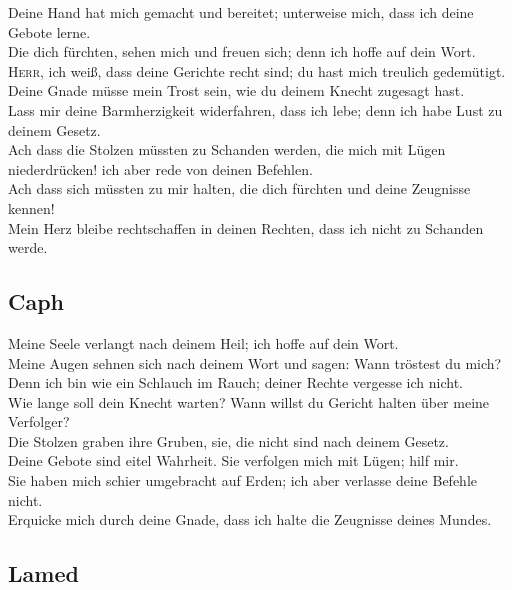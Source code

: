  Deine Hand hat mich gemacht und bereitet; unterweise
mich, dass ich deine Gebote lerne.\\
 Die dich fürchten, sehen mich und freuen sich; denn ich
hoffe auf dein Wort.\\
 \textsc{Herr}, ich weiß, dass deine Gerichte recht sind;
du hast mich treulich gedemütigt.\\
 Deine Gnade müsse mein Trost sein, wie du deinem Knecht
zugesagt hast.\\
 Lass mir deine Barmherzigkeit widerfahren, dass ich
lebe; denn ich habe Lust zu deinem Gesetz.\\
 Ach dass die Stolzen müssten zu Schanden werden, die
mich mit Lügen niederdrücken! ich aber rede von deinen Befehlen.\\
 Ach dass sich müssten zu mir halten, die dich fürchten
und deine Zeugnisse kennen!\\
 Mein Herz bleibe rechtschaffen in deinen Rechten, dass
ich nicht zu Schanden werde.

\hypertarget{caph}{%
\subsection{Caph}\label{caph}}

 Meine Seele verlangt nach deinem Heil; ich hoffe auf
dein Wort.\\
 Meine Augen sehnen sich nach deinem Wort und sagen: Wann
tröstest du mich?\\
 Denn ich bin wie ein Schlauch im Rauch; deiner Rechte
vergesse ich nicht.\\
 Wie lange soll dein Knecht warten? Wann willst du
Gericht halten über meine Verfolger?\\
 Die Stolzen graben ihre Gruben, sie, die nicht sind nach
deinem Gesetz.\\
 Deine Gebote sind eitel Wahrheit. Sie verfolgen mich mit
Lügen; hilf mir.\\
 Sie haben mich schier umgebracht auf Erden; ich aber
verlasse deine Befehle nicht.\\
 Erquicke mich durch deine Gnade, dass ich halte die
Zeugnisse deines Mundes.

\hypertarget{lamed}{%
\subsection{Lamed}\label{lamed}}

